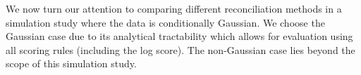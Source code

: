 \documentclass[12pt]{article}
\def\E{\text{E}}
\theoremstyle{definition}
\begin{document}
%
%
%
%
%
%


We now turn our attention to comparing different reconciliation methods in a simulation study where the data is conditionally Gaussian. We choose the Gaussian case due to its analytical tractability which allows for evaluation using all scoring rules (including the log score). The non-Gaussian case lies beyond the scope of this simulation study.
\end{document}

